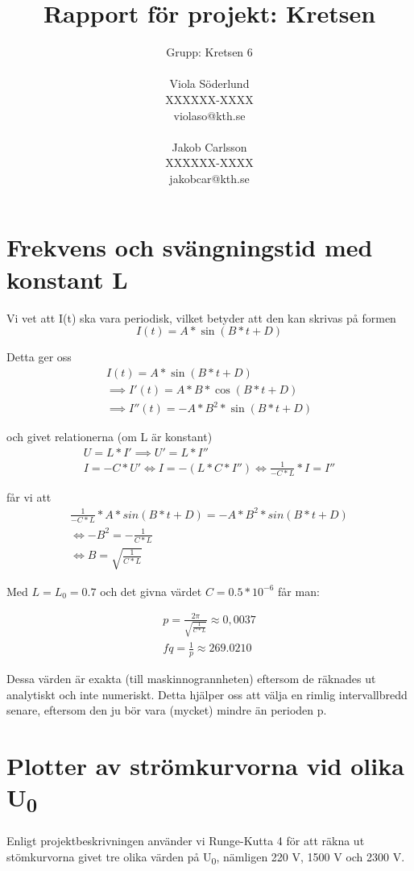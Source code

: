 \documentclass[a4paper, titlepage, 11pt]{article}
\title{Rapport för projekt: Kretsen}
\author{Grupp: Kretsen 6 \\ \\
Viola Söderlund \\ XXXXXX-XXXX \\ violaso@kth.se \\ \\
Jakob Carlsson \\ XXXXXX-XXXX \\ jakobcar@kth.se}
\begin{document}
\maketitle

\section{Frekvens och svängningstid med konstant L}
Vi vet att I(t) ska vara periodisk, vilket betyder att den kan skrivas på formen
$$I(t) = A*\sin(B*t + D)$$

Detta ger oss
\begin{gather*}
    I(t) = A*\sin(B*t + D) \\
    \implies I'(t) = A*B*\cos(B*t + D) \\
    \implies I''(t) = -A*B^2*\sin(B*t + D)
\end{gather*}

och givet relationerna (om L är konstant)
\begin{gather}
    U = L*I' \implies U' = L*I'' \\ %
    I = -C*U' \iff I = -(L*C*I'') \iff \frac{1}{-C*L} * I = I''
\end{gather}

får vi att
\begin{gather*}
    \frac{1}{-C*L} * A*sin(B*t + D) = -A*B^2*sin(B*t + D) \\
    \iff -B^2 = -\frac{1}{C*L} \\
    \iff B = \sqrt{\frac{1}{C*L}}
\end{gather*}

Med $L = L_0 = 0.7$ och det givna värdet $C = 0.5*10^{-6}$ får man:

\begin{gather*}
    p = \frac{2\pi}{\sqrt{\frac{1}{C*L}}} \approx 0,0037 \\
    fq = \frac{1}{p} \approx 269.0210
\end{gather*}

Dessa värden är exakta (till maskinnogrannheten) eftersom de räknades ut analytiskt och inte numeriskt. Detta hjälper oss att välja en rimlig intervallbredd senare, eftersom den ju bör vara (mycket) mindre än perioden p.


\section{Plotter av strömkurvorna vid olika U\textsubscript{0}}
Enligt projektbeskrivningen använder vi Runge-Kutta 4 för att räkna ut stömkurvorna givet tre olika värden på U\textsubscript{0}, nämligen 220 V, 1500 V och 2300 V.
\end{document}
